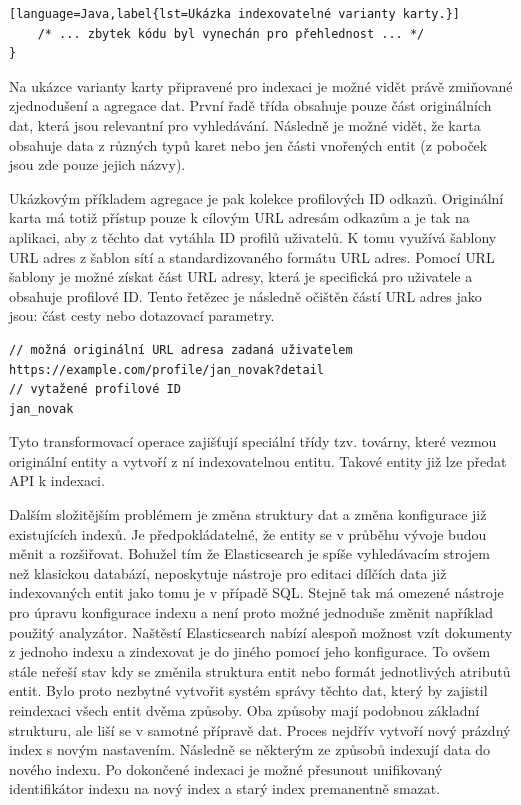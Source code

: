 \begin{itemize}
\begin{itemize}
\begin{lstlisting}[language=Java,label{lst=Ukázka indexovatelné varianty karty.}]
    /* ... zbytek kódu byl vynechán pro přehlednost ... */
}
		\end{lstlisting}

		Na ukázce varianty karty připravené pro indexaci je možné vidět právě zmiňované zjednodušení a agregace dat.
		První řadě třída obsahuje pouze část originálních dat, která jsou relevantní pro vyhledávání.
		Následně je možné vidět, že karta obsahuje data z různých typů karet nebo jen části vnořených entit (z poboček jsou
		zde pouze jejich názvy).

		Ukázkovým příkladem agregace je pak kolekce profilových ID odkazů.
		Originální karta má totiž přístup pouze k cílovým \ac{URL} adresám odkazům a je tak na aplikaci, aby z těchto dat
		vytáhla ID profilů uživatelů.
		K tomu využívá šablony \ac{URL} adres z šablon sítí a standardizovaného formátu \ac{URL} adres.
		Pomocí \ac{URL} šablony je možné získat část \ac{URL} adresy, která je specifická pro uživatele a obsahuje profilové ID.
		Tento řetězec je následně očištěn částí \ac{URL} adres jako jsou: část cesty nebo dotazovací parametry.

		\begin{lstlisting}[label={lst=Ukázka transformace URL adresy na profilové ID.}]
// možná originální URL adresa zadaná uživatelem
https://example.com/profile/jan_novak?detail
// vytažené profilové ID
jan_novak
		\end{lstlisting}

		Tyto transformovací operace zajišťují speciální třídy tzv. továrny, které vezmou originální entity a vytvoří
		z ní indexovatelnou entitu.
		Takové entity již lze předat \ac{API} k indexaci.

		Dalším složitějším problémem je změna struktury dat a změna konfigurace již existujících indexů.
		Je předpokládatelné, že entity se v průběhu vývoje budou měnit a rozšiřovat.
		Bohužel tím že Elasticsearch je spíše vyhledávacím strojem než klasickou databází, neposkytuje nástroje pro editaci
		dílčích data již indexovaných entit jako tomu je v případě \ac{SQL}.
		Stejně tak má omezené nástroje pro úpravu konfigurace indexu a není proto možné jednoduše změnit například
		použitý analyzátor.
		Naštěstí Elasticsearch nabízí alespoň možnost vzít dokumenty z jednoho indexu a zindexovat je do jiného pomocí jeho
		konfigurace.
		To ovšem stále neřeší stav kdy se změnila struktura entit nebo formát jednotlivých atributů entit.
		Bylo proto nezbytné vytvořit systém správy těchto dat, který by zajistil reindexaci všech entit dvěma způsoby.
		Oba způsoby mají podobnou základní strukturu, ale liší se v samotné přípravě dat.
		Proces nejdřív vytvoří nový prázdný index s novým nastavením.
		Následně se některým ze způsobů indexují data do nového indexu.
		Po dokončené indexaci je možné přesunout unifikovaný identifikátor indexu na nový index a starý index premanentně
		smazat.


\end{itemize}
\end{itemize}

